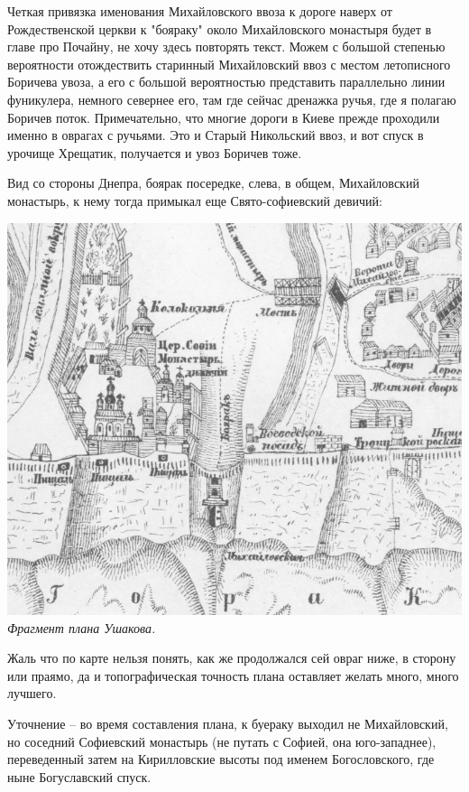 Четкая привязка именования Михайловского ввоза к дороге наверх от Рождественской церкви к "бояраку" около Михайловского монастыря будет в главе про Почайну, не хочу здесь повторять текст. Можем с большой степенью вероятности отождествить старинный Михайловский ввоз с местом летописного Боричева увоза, а его с большой вероятностью представить параллельно линии фуникулера, немного севернее его, там где сейчас дренажка ручья, где я полагаю Боричев поток. Примечательно, что многие дороги в Киеве прежде проходили именно в оврагах с ручьями. Это и Старый Никольский ввоз, и вот спуск в урочище Хрещатик, получается и увоз Боричев тоже.

Вид со стороны Днепра, боярак посередке, слева, в общем, Михайловский монастырь, к нему тогда примыкал еще Свято-софиевский девичий:

\begin{center}
\includegraphics[width=\linewidth]{chast-colebanie-osnov/uvoz-borichev/1695-borichev.png}
\\
\textit{Фрагмент плана Ушакова.}
\end{center}

Жаль что по карте нельзя понять, как же продолжался сей овраг ниже, в сторону или праямо, да и топографическая точность плана оставляет желать много, много лучшего.

Уточнение – во время составления плана, к буераку выходил не Михайловский, но соседний Софиевский монастырь (не путать с Софией, она юго-западнее), переведенный затем на Кирилловские высоты под именем Богословского, где ныне Богуславский спуск.

